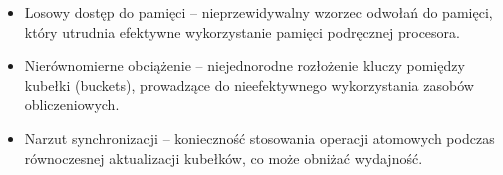 \begin{itemize}
    \item Losowy dostęp do pamięci – nieprzewidywalny wzorzec odwołań do pamięci, który utrudnia efektywne wykorzystanie pamięci podręcznej procesora.
    
    \item Nierównomierne obciążenie – niejednorodne rozłożenie kluczy pomiędzy kubełki (buckets), prowadzące do nieefektywnego wykorzystania zasobów obliczeniowych.
    
    \item Narzut synchronizacji – konieczność stosowania operacji atomowych podczas równoczesnej aktualizacji kubełków, co może obniżać wydajność.
  \end{itemize}
  